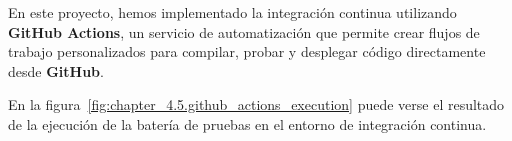 En este proyecto, hemos implementado la integración continua utilizando \textbf{GitHub Actions}, un servicio de
automatización que permite crear flujos de trabajo personalizados para compilar, probar y desplegar código directamente
desde \textbf{GitHub}.

En la figura~\ref{fig:chapter_4.5.github_actions_execution} puede verse el resultado de la ejecución de la batería de
pruebas en el entorno de integración continua.